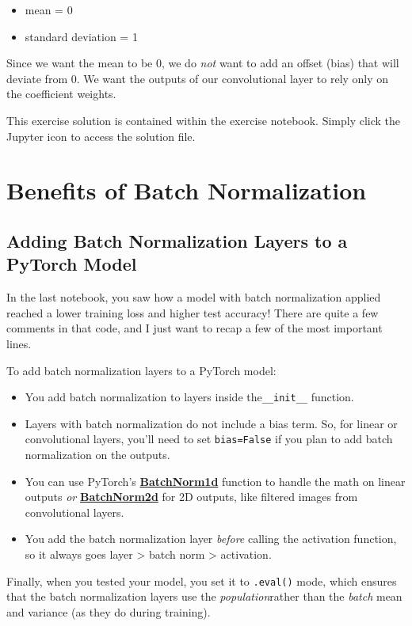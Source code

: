 \begin{itemize}
    \item mean = 0
    \item standard deviation = 1
\end{itemize}
Since we want the mean to be 0, we do \textit{not} want to add an offset (bias) that will deviate from 0. We want the outputs of our convolutional layer to rely only on the coefficient weights. \newline

This exercise solution is contained within the exercise notebook. Simply click the Jupyter icon to access the solution file.

\section{Benefits of Batch Normalization}

\subsection{Adding Batch Normalization Layers to a PyTorch Model}
In the last notebook, you saw how a model with batch normalization applied reached a lower training loss and higher test accuracy! There are quite a few comments in that code, and I just want to recap a few of the most important lines. \newline

To add batch normalization layers to a PyTorch model:

\begin{itemize}
    \item You add batch normalization to layers inside the\lstinline{__init__} function.
    \item Layers with batch normalization do not include a bias term. So, for linear or convolutional layers, you'll need to set \lstinline{bias=False} if you plan to add batch normalization on the outputs.
    \item You can use PyTorch's \href{https://pytorch.org/docs/stable/generated/torch.nn.BatchNorm1d.html}{\textbf{BatchNorm1d}} function to handle the math on linear outputs \textit{or} \href{https://pytorch.org/docs/stable/generated/torch.nn.BatchNorm2d.html}{\textbf{BatchNorm2d}} for 2D outputs, like filtered images from convolutional layers.
    \item You add the batch normalization layer \textit{before} calling the activation function, so it always goes layer > batch norm > activation.
\end{itemize}
Finally, when you tested your model, you set it to \lstinline{.eval()} mode, which ensures that the batch normalization layers use the \textit{population}rather than the \textit{batch} mean and variance (as they do during training).

